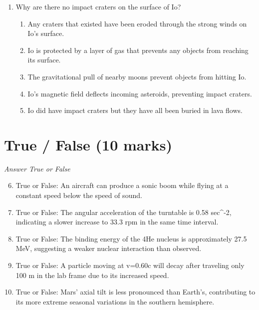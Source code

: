 \documentclass[12pt]{article}
\begin{document}
\begin{enumerate}[label=\arabic*.]
\begin{enumerate}[label=(\alph*)]
    \item 5.3
    \item 1.5
    \item 4.2
    \item 8.4
    \item 3.8
\end{enumerate}
\item Why are there no impact craters on the surface of Io?
\begin{enumerate}[label=(\alph*)]
    \item Any craters that existed have been eroded through the strong winds on Io's surface.
    \item Io is protected by a layer of gas that prevents any objects from reaching its surface.
    \item The gravitational pull of nearby moons prevent objects from hitting Io.
    \item Io's magnetic field deflects incoming asteroids, preventing impact craters.
    \item Io did have impact craters but they have all been buried in lava flows.
\end{enumerate}
\end{enumerate}

\section*{True / False (10 marks)}
\textit{Answer True or False}
\begin{enumerate}[label=\arabic*.]
\setcounter{enumi}{5}
\item True or False: An aircraft can produce a sonic boom while flying at a constant speed below the speed of sound.
\item True or False: The angular acceleration of the turntable is 0.58 sec\^{}-2, indicating a slower increase to 33.3 rpm in the same time interval.
\item True or False: The binding energy of the 4He nucleus is approximately 27.5 MeV, suggesting a weaker nuclear interaction than observed.
\item True or False: A particle moving at v=0.60c will decay after traveling only 100 m in the lab frame due to its increased speed.
\item True or False: Mars' axial tilt is less pronounced than Earth's, contributing to its more extreme seasonal variations in the southern hemisphere.
\end{enumerate}
\end{document}
